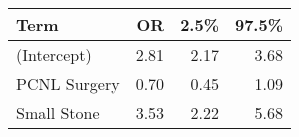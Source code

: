 \begin{table}[ht]
\centering
\begin{tabular}{lrrr}
  \toprule
{\textbf{Term}} & {\textbf{OR}} & {\textbf{2.5\%}} & {\textbf{97.5\%}} \\ 
  \midrule
(Intercept) & 2.81 & 2.17 & 3.68 \\ 
  PCNL Surgery & 0.70 & 0.45 & 1.09 \\ 
  Small Stone & 3.53 & 2.22 & 5.68 \\ 
   \bottomrule
\end{tabular}
\end{table}
